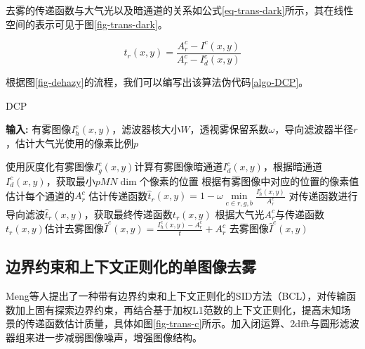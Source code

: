 去雾的传递函数与大气光以及暗通道的关系如公式\eqref{eq-trans-dark}所示，其在线性空间的表示可见于图\ref{fig-trans-dark}。

\begin{equation}
    t_r(x,y) = \frac{A_r^c - I^c(x,y)}{A_r^c - I_d^c(x,y)}
    \label{eq-trans-dark}
\end{equation}

根据图\ref{fig-dehazy}的流程，我们可以编写出该算法伪代码\ref{algo-DCP}。

\begin{algorithm}[t]
    \caption{DCP}
    \label{algo-DCP}
    \textbf{输入:} 有雾图像$I_h^c(x,y)$，滤波器核大小$W$，透视雾保留系数$\omega$，导向滤波器半径$r$，估计大气光使用的像素比例$p$
    \begin{algorithmic}
    \State 使用灰度化有雾图像$I_g^c(x,y)$计算有雾图像暗通道$I_d^c(x,y)$，根据暗通道 $I_d^c(x,y)$，获取最小$pMN\dim$个像素的位置
    \State 根据有雾图像中对应的位置的像素值估计每个通道的$A_r^c$
    \State 估计传递函数$\hat t_r(x,y) = 1 - \omega \min\limits_{c\in{r,g,b}}\frac    {I_h^c(x,y)}{A_r^c}$
    \State 对传递函数进行导向滤波\cite{he.tang201306}$\hat t_r(x,y)$，获取最终传递函数$t_r(x,y)$
    \State 根据大气光$A_r^c$与传递函数$t_r(x,y)$估计去雾图像$\hat I^c(x,y) = \frac{I_h^c(x,y) - A_r^c}{t} + A_r^c$
    \State \Return 去雾图像$\hat I^c(x,y)$
    \end{algorithmic}
\end{algorithm}

\subsection{边界约束和上下文正则化的单图像去雾}
Meng等人\cite{meng.pan201312}提出了一种带有边界约束和上下文正则化的SID方法（BCL），对传输函数加上固有探索边界约束，再结合基于加权L1范数的上下文正则化，提高未知场景的传递函数估计质量，具体如图\ref{fig-trans-c}所示。加入闭运算、2dfft与圆形滤波器组来进一步减弱图像噪声，增强图像结构。

